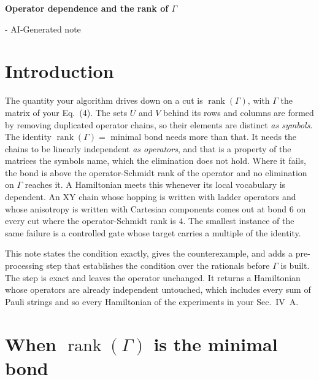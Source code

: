 \documentclass[11pt,a4paper]{article}
\newcommand{\rank}{\operatorname{rank}}
\begin{document}
\begin{center}
{\LARGE\bfseries Operator dependence and the rank of $\Gamma$\par - AI-Generated note}
\vspace{0.5em}
\end{center}

\section*{Introduction}

The quantity your algorithm drives down on a cut is $\rank(\Gamma)$, with $\Gamma$ the matrix of
your Eq.~(4). The sets $U$ and $V$ behind its rows and columns are formed by removing duplicated operator
chains, so their elements are distinct \emph{as symbols}. The identity $\rank(\Gamma) = $ minimal
bond needs more than that. It needs the chains to be linearly independent \emph{as operators}, and
that is a property of the matrices the symbols name, which the elimination does not hold. Where it
fails, the bond is above the operator-Schmidt rank of the operator and no elimination on $\Gamma$
reaches it. A Hamiltonian meets this whenever its local vocabulary is dependent. An XY chain whose
hopping is written with ladder operators and whose anisotropy is written with Cartesian components
comes out at bond $6$ on every cut where the operator-Schmidt rank is $4$. The smallest instance of
the same failure is a controlled gate whose target carries a multiple of the identity.

This note states the condition exactly, gives the counterexample, and adds a pre-processing step
that establishes the condition over the rationals before $\Gamma$ is built. The step is exact and
leaves the operator unchanged. It returns a Hamiltonian whose operators are already independent
untouched, which includes every sum of Pauli strings and so every Hamiltonian of the experiments in
your Sec.~IV~A.

\section{When \texorpdfstring{$\rank(\Gamma)$}{rank(Gamma)} is the minimal bond}\label{sec:gamma}
\end{document}
